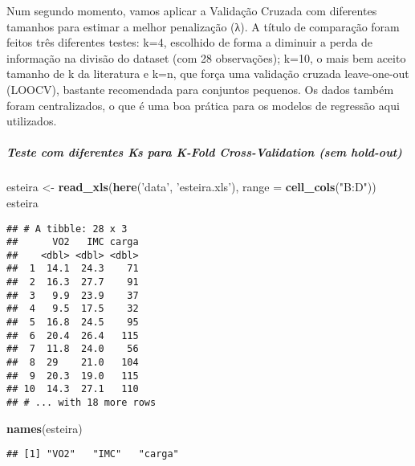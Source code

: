 \documentclass[]{article}
\newenvironment{Shaded}{\begin{snugshade}}{\end{snugshade}}
\newcommand{\DataTypeTok}[1]{\textcolor[rgb]{0.13,0.29,0.53}{#1}}
\newcommand{\KeywordTok}[1]{\textcolor[rgb]{0.13,0.29,0.53}{\textbf{#1}}}
\newcommand{\NormalTok}[1]{#1}
\newcommand{\StringTok}[1]{\textcolor[rgb]{0.31,0.60,0.02}{#1}}
\let\oldsubparagraph\subparagraph
\renewcommand{\subparagraph}[1]{\oldsubparagraph{#1}\mbox{}}
\begin{document}
Num segundo momento, vamos aplicar a Validação Cruzada com diferentes
tamanhos para estimar a melhor penalização (λ). A título de comparação
foram feitos três diferentes testes: k=4, escolhido de forma a diminuir
a perda de informação na divisão do dataset (com 28 observações); k=10,
o mais bem aceito tamanho de k da literatura e k=n, que força uma
validação cruzada leave-one-out (LOOCV), bastante recomendada para
conjuntos pequenos. Os dados também foram centralizados, o que é uma boa
prática para os modelos de regressão aqui utilizados.

\hypertarget{teste-com-diferentes-ks-para-k-fold-cross-validation-sem-hold-out}{%
\subparagraph{Teste com diferentes Ks para K-Fold Cross-Validation (sem
hold-out)}\label{teste-com-diferentes-ks-para-k-fold-cross-validation-sem-hold-out}}

\begin{Shaded}
\begin{Highlighting}[]
\NormalTok{esteira <-}\StringTok{ }\KeywordTok{read_xls}\NormalTok{(}\KeywordTok{here}\NormalTok{(}\StringTok{'data'}\NormalTok{, }\StringTok{'esteira.xls'}\NormalTok{), }\DataTypeTok{range =} \KeywordTok{cell_cols}\NormalTok{(}\StringTok{"B:D"}\NormalTok{))}
\NormalTok{esteira}
\end{Highlighting}
\end{Shaded}

\begin{verbatim}
## # A tibble: 28 x 3
##      VO2   IMC carga
##    <dbl> <dbl> <dbl>
##  1  14.1  24.3    71
##  2  16.3  27.7    91
##  3   9.9  23.9    37
##  4   9.5  17.5    32
##  5  16.8  24.5    95
##  6  20.4  26.4   115
##  7  11.8  24.0    56
##  8  29    21.0   104
##  9  20.3  19.0   115
## 10  14.3  27.1   110
## # ... with 18 more rows
\end{verbatim}

\begin{Shaded}
\begin{Highlighting}[]
\KeywordTok{names}\NormalTok{(esteira)}
\end{Highlighting}
\end{Shaded}

\begin{verbatim}
## [1] "VO2"   "IMC"   "carga"
\end{verbatim}
\end{document}
